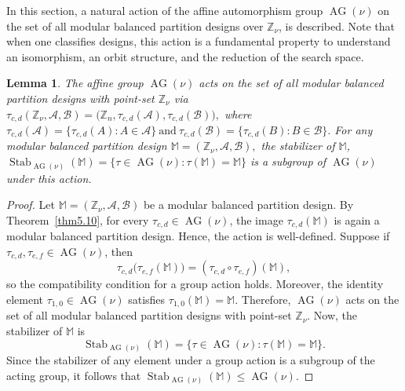 \documentclass[preprint,11pt]{elsarticle}
\newcommand{\AG}{\operatorname{AG}}
\newtheorem{lemma}[theorem]{Lemma}
\begin{document}
In this section, a natural action of the affine automorphism group $\AG(\nu)$ on the set of all modular balanced partition designs over $\mathbb Z_\nu$, is described. Note that when one classifies designs, this action is a fundamental property to  understand an isomorphism, an orbit structure, and the reduction of the search space.
\begin{lemma}
\label{lem:AG-action}
The affine group $\AG(\nu)$ acts on the set of all modular balanced partition designs with point-set $\mathbb Z_\nu$ via
\(
\tau_{c,d}(\mathbb Z_\nu,\mathcal A,\mathcal B)
=
\bigl(\mathbb Z_n,\tau_{c,d}(\mathcal A),\tau_{c,d}(\mathcal B)\bigr),
\)
where
\(
\tau_{c,d}(\mathcal A)
=
\{\tau_{c,d}(A):A\in\mathcal A\}
~\text{and}~
\tau_{c,d}(\mathcal B)
=
\{\tau_{c,d}(B):B\in\mathcal B\}.
\)
For any modular balanced partition design
\(
\mathbb M=(\mathbb Z_\nu,\mathcal A,\mathcal B),
\)
the stabilizer of $\mathbb M$,
\(
\operatorname{Stab}_{\AG(\nu)}(\mathbb M)
=
\{\tau\in\AG(\nu):\tau(\mathbb M)=\mathbb M\}
\) 
is a subgroup of $\AG(\nu)$ under this action.
\end{lemma}
\begin{proof}
Let
\(
\mathbb M=(\mathbb Z_\nu,\mathcal A,\mathcal B)
\) be a modular balanced partition design.
By Theorem~\ref{thm5.10}, for every
$\tau_{c,d}\in \AG(\nu)$,
the image
\(
\tau_{c,d}(\mathbb M)
\)
is again a modular balanced partition design. Hence, the action is well-defined.
Suppose if $\tau_{c,d},\tau_{e,f}\in\AG(\nu)$, then 
\[
\tau_{c,d}\bigl(\tau_{e,f}(\mathbb M)\bigr)
=
(\tau_{c,d}\circ\tau_{e,f})(\mathbb M),
\]
so the compatibility condition for a group action holds. Moreover, the identity element
$\tau_{1,0}\in\AG(\nu)$
satisfies
\(
\tau_{1,0}(\mathbb M)=\mathbb M.
\)
Therefore, $\AG(\nu)$ acts on the set of all modular balanced partition designs with point-set $\mathbb Z_\nu$. Now, the stabilizer of $\mathbb M$ is
\[
\operatorname{Stab}_{\AG(\nu)}(\mathbb M)
=
\{\tau\in\AG(\nu):\tau(\mathbb M)=\mathbb M\}.
\]
Since the stabilizer of any element under a group action is a subgroup of the acting group, it follows that
\(
\operatorname{Stab}_{\AG(\nu)}(\mathbb M)
\leq \AG(\nu).
\)
\end{proof}
\end{document}
